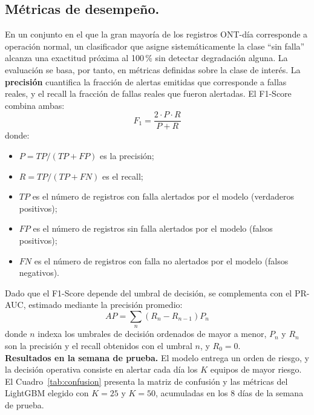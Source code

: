 \documentclass[12pt,a4paper]{article}
\begin{document}
\subsection{Métricas de desempeño.}
\label{subsec:metricas}
En un conjunto en el que la gran mayoría de los registros ONT-día corresponde a operación normal,
 un clasificador que asigne sistemáticamente la clase ``sin falla'' alcanza una exactitud próxima al 100\,\%
  sin detectar degradación alguna. La evaluación se basa, por tanto, en métricas definidas sobre la clase de interés.
   La \textbf{precisión} cuantifica la fracción de alertas emitidas que corresponde a fallas reales, y el
    recall la fracción de fallas reales que fueron alertadas. El F1-Score combina ambas:
\begin{equation}
    F_1 = \frac{2 \cdot P \cdot R}{P + R}
    \label{eq:f1}
\end{equation}
donde:
\begin{itemize}
    \item $P = TP/(TP + FP)$ es la precisión;
    \item $R = TP/(TP + FN)$ es el recall;
    \item $TP$ es el número de registros con falla alertados por el modelo (verdaderos positivos);
    \item $FP$ es el número de registros sin falla alertados por el modelo (falsos positivos);
    \item $FN$ es el número de registros con falla no alertados por el modelo (falsos negativos).
\end{itemize}
Dado que el F1-Score depende del umbral de decisión, se complementa con el PR-AUC, estimado mediante la precisión promedio:
\begin{equation}
    AP = \sum_{n} \left( R_n - R_{n-1} \right) P_n
    \label{eq:ap}
\end{equation}
donde $n$ indexa los umbrales de decisión ordenados de mayor a menor, $P_n$ y $R_n$ son la precisión y el recall obtenidos con el umbral $n$, y $R_0 = 0$. \\

\noindent
\textbf{Resultados en la semana de prueba.} El modelo entrega un orden de riesgo, y la decisión operativa consiste en alertar cada día los $K$ equipos de mayor riesgo. El Cuadro~\ref{tab:confusion} presenta la matriz de confusión y las métricas del LightGBM elegido con $K = 25$ y $K = 50$, acumuladas en los 8 días de la semana de prueba.
\end{document}
